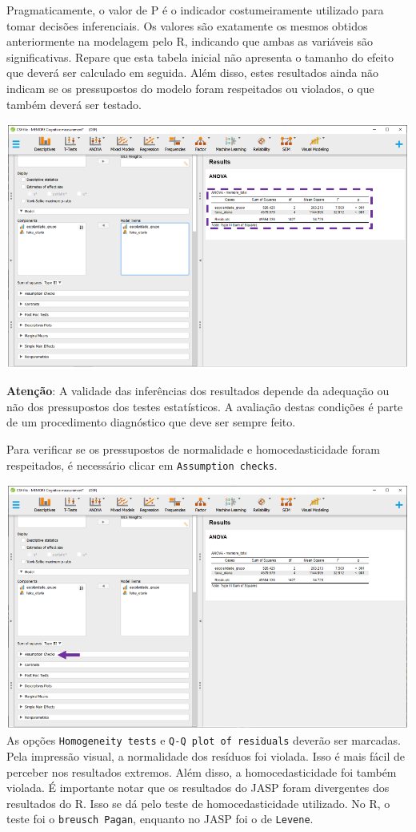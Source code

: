 \documentclass[
]{book}
\begin{document}
Pragmaticamente, o valor de P é o indicador costumeiramente utilizado para tomar decisões inferenciais. Os valores são exatamente os mesmos obtidos anteriormente na modelagem pelo R, indicando que ambas as variáveis são significativas. Repare que esta tabela inicial não apresenta o tamanho do efeito que deverá ser calculado em seguida. Além disso, estes resultados ainda não indicam se os pressupostos do modelo foram respeitados ou violados, o que também deverá ser testado.

\includegraphics{./img/cap_anova_two_way_resultados.png}

\textbf{Atenção}: A validade das inferências dos resultados depende da adequação ou não dos pressupostos dos testes estatísticos. A avaliação destas condições é parte de um procedimento diagnóstico que deve ser sempre feito.

Para verificar se os pressupostos de normalidade e homocedasticidade foram respeitados, é necessário clicar em \texttt{Assumption\ checks}.

\includegraphics{./img/cap_anova_two_way_pressupostos.png}
As opções \texttt{Homogeneity\ tests} e \texttt{Q-Q\ plot\ of\ residuals} deverão ser marcadas. Pela impressão visual, a normalidade dos resíduos foi violada. Isso é mais fácil de perceber nos resultados extremos. Além disso, a homocedasticidade foi também violada. É importante notar que os resultados do JASP foram divergentes dos resultados do R. Isso se dá pelo teste de homocedasticidade utilizado. No R, o teste foi o \texttt{breusch\ Pagan}, enquanto no JASP foi o de \texttt{Levene}.
\end{document}

